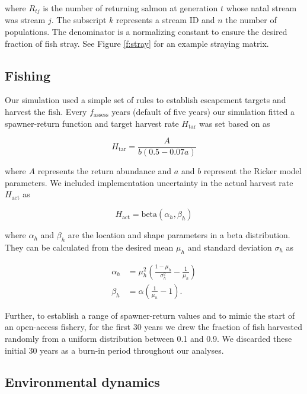 \noindent where $R_{tj}$ is the number of returning salmon at generation $t$ whose natal stream was stream $j$. The subscript $k$ represents a stream ID and $n$ the number of populations. The denominator is a normalizing constant to ensure the desired fraction of fish stray. See Figure \ref{f:stray} for an example straying matrix.

\subsection{Fishing}

Our simulation used a simple set of rules to establish escapement targets and harvest the fish. Every $f_\mathrm{assess}$ years (default of five years) our simulation fitted a spawner-return function and target harvest rate $H_{\mathrm{tar}}$ was set based on \citet{hilborn1992} as

\begin{equation}
  H_{\mathrm{tar}} = \frac{A}{b (0.5 - 0.07a)}
  \label{eq:esc}
\end{equation}

\noindent where $A$ represents the return abundance and $a$ and $b$ represent the Ricker model parameters. We included implementation uncertainty in the actual harvest rate $H_{\mathrm{act}}$ as

\begin{equation}
  H_{\mathrm{act}} = \mathrm{beta}(\alpha_h, \beta_h)
\end{equation}

\noindent where $\alpha_h$ and $\beta_h$ are the location and shape parameters in a beta distribution. They can be calculated from the desired mean $\mu_h$ and standard deviation $\sigma_h$ as \citep[p.~97]{morgan1990}

\begin{align}
  \alpha_h &= \mu_h^2
                \left(
                \frac{1 - \mu_h}{\sigma_h^2} - \frac{1}{\mu_h}
                \right)\\
   \beta_h &= \alpha \left({\frac{1}{\mu_h} - 1}\right).
\end{align}

\noindent Further, to establish a range of spawner-return values and to mimic the start of an open-access fishery, for the first 30 years we drew the fraction of fish harvested randomly from a uniform distribution between 0.1 and 0.9. We discarded these initial 30 years as a burn-in period throughout our analyses.

\subsection{Environmental dynamics}

